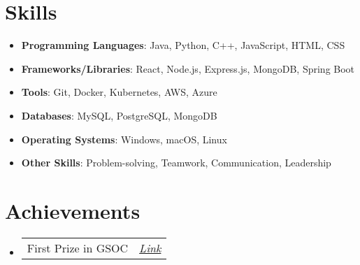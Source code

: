 \documentclass[a4paper,11pt]{article}
\makeatletter
\newcommand{\resumeItem}[2]{
  \item{
    \textbf{#1}{\hspace{0.5mm}#2 \vspace{-0.5mm}}
  }
}
\newcommand{\resumePOR}[3]{
\vspace{0.5mm}\item
    \begin{tabular*}{0.97\textwidth}[t]{l@{\extracolsep{\fill}}r}
        \textbf{#1}\hspace{0.3mm}#2 & \textit{\small{#3}} 
    \end{tabular*}
    \vspace{-2mm}
}
\newcommand{\resumeSubItem}[2]{\resumeItem{#1}{#2}\vspace{-4pt}}
\newcommand{\resumeSubHeadingListStart}{\begin{itemize}[leftmargin=*,labelsep=1mm]}
\newcommand{\resumeHeadingSkillStart}{\begin{itemize}[leftmargin=*,itemsep=1.7mm, rightmargin=2ex]}
\newcommand{\resumeSubHeadingListEnd}{\end{itemize}\vspace{2mm}}
\newcommand{\resumeHeadingSkillEnd}{\end{itemize}\vspace{-2mm}}
\makeatother
\begin{document}

    \section{Skills}
\vspace{-0.4mm}
\resumeHeadingSkillStart
\resumeSubItem{Programming Languages}{: Java, Python, C++, JavaScript, HTML, CSS}\resumeSubItem{Frameworks/Libraries}{: React, Node.js, Express.js, MongoDB, Spring Boot}\resumeSubItem{Tools}{: Git, Docker, Kubernetes, AWS, Azure}\resumeSubItem{Databases}{: MySQL, PostgreSQL, MongoDB}\resumeSubItem{Operating Systems}{: Windows, macOS, Linux}\resumeSubItem{Other Skills}{: Problem-solving, Teamwork, Communication, Leadership}
\resumeHeadingSkillEnd
\vspace{-2mm}
  





\section{Achievements} 
\vspace{-0.2mm}
\resumeSubHeadingListStart
  
      \resumePOR{}{First Prize in GSOC}
      {\href{https://gsocevent.com}{Link}}
      
\resumeSubHeadingListEnd
\vspace{-6mm}



    
\end{document}
